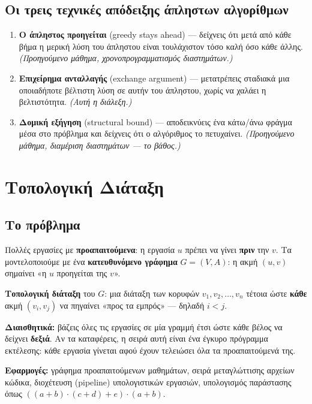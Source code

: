\documentclass[11pt,a4paper]{article}
\begin{document}
\subsection{Οι τρεις τεχνικές απόδειξης άπληστων αλγορίθμων}

\begin{keypoint}
\begin{enumerate}
  \item \textbf{Ο άπληστος προηγείται} (greedy stays ahead) --- δείχνεις ότι
  μετά από κάθε βήμα η μερική λύση του άπληστου είναι τουλάχιστον τόσο καλή όσο
  κάθε άλλης. \textit{(Προηγούμενο μάθημα, χρονοπρογραμματισμός διαστημάτων.)}
  \item \textbf{Επιχείρημα ανταλλαγής} (exchange argument) --- μετατρέπεις
  σταδιακά μια οποιαδήποτε βέλτιστη λύση σε αυτήν του άπληστου, χωρίς να χαλάει η
  βελτιστότητα. \textit{(Αυτή η διάλεξη.)}
  \item \textbf{Δομική εξήγηση} (structural bound) --- αποδεικνύεις ένα
  κάτω/άνω φράγμα μέσα στο πρόβλημα και δείχνεις ότι ο αλγόριθμος το πετυχαίνει.
  \textit{(Προηγούμενο μάθημα, διαμέριση διαστημάτων --- το βάθος.)}
\end{enumerate}
\end{keypoint}

\section{Τοπολογική Διάταξη}

\subsection{Το πρόβλημα}

Πολλές εργασίες με \textbf{προαπαιτούμενα}: η εργασία $u$ πρέπει να γίνει
\textbf{πριν} την $v$. Τα μοντελοποιούμε με ένα \textbf{κατευθυνόμενο γράφημα}
$G = (V, A)$: η ακμή $(u, v)$ σημαίνει «η $u$ προηγείται της $v$».

\begin{keypoint}
\textbf{Τοπολογική διάταξη} του $G$: μια διάταξη των κορυφών
$v_1, v_2, \dots, v_n$ τέτοια ώστε \textbf{κάθε} ακμή $(v_i, v_j)$ να πηγαίνει
«προς τα εμπρός» --- δηλαδή $i < j$.
\end{keypoint}

\begin{intuition}
\textbf{Διαισθητικά:} βάζεις όλες τις εργασίες σε μία γραμμή έτσι ώστε κάθε βέλος
να δείχνει \textbf{δεξιά}. Αν τα καταφέρεις, η σειρά αυτή είναι ένα έγκυρο
πρόγραμμα εκτέλεσης: κάθε εργασία γίνεται αφού έχουν τελειώσει όλα τα
προαπαιτούμενά της.

\textbf{Εφαρμογές:} γράφημα προαπαιτούμενων μαθημάτων, σειρά μεταγλώττισης
αρχείων κώδικα, διοχέτευση (pipeline) υπολογιστικών εργασιών, υπολογισμός
παράστασης όπως $((a+b)\cdot(c+d)+e)\cdot(a+b)$.
\end{intuition}
\end{document}
